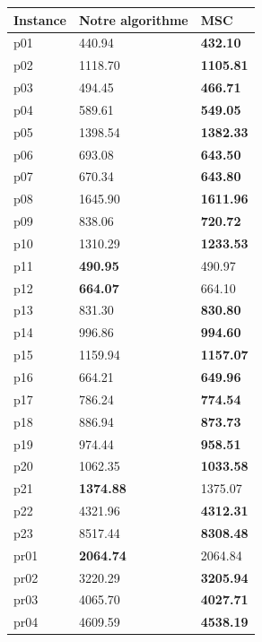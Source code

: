 \begin{xltabular}{12cm}{|X|X|X|}
  \hline
  Instance & Notre algorithme     & MSC      \\\hline
  p01      &  440.94  & \textbf{432.10}   \\\hline
  p02      & 1118.70 & \textbf{1105.81}  \\\hline
  p03      & 494.45  & \textbf{466.71}   \\\hline
  p04      & 589.61  & \textbf{549.05}   \\\hline
  p05      & 1398.54 & \textbf{1382.33}  \\\hline
  p06      & 693.08  & \textbf{643.50}   \\\hline
  p07      & 670.34  & \textbf{643.80}   \\\hline
  p08      & 1645.90 & \textbf{1611.96}  \\\hline
  p09      & 838.06  & \textbf{720.72}   \\\hline
  p10      & 1310.29 & \textbf{1233.53}  \\\hline
  p11      & \textbf{490.95}& 490.97   \\\hline
  p12      & \textbf{664.07}  & 664.10   \\\hline
  p13      & 831.30  & \textbf{830.80}   \\\hline
  p14      & 996.86  & \textbf{994.60}   \\\hline
  p15      & 1159.94 & \textbf{1157.07}  \\\hline
  p16      & 664.21  & \textbf{649.96}   \\\hline
  p17      & 786.24  & \textbf{774.54}   \\\hline
  p18      & 886.94  & \textbf{873.73}   \\\hline
  p19      & 974.44  & \textbf{958.51}   \\\hline
  p20      & 1062.35 & \textbf{1033.58}  \\\hline
  p21      & \textbf{1374.88} & 1375.07 \\\hline
  p22      & 4321.96 & \textbf{4312.31}  \\\hline
  p23      & 8517.44 & \textbf{8308.48}  \\\hline
  pr01     & \textbf{2064.74} & 2064.84  \\\hline
  pr02     & 3220.29 & \textbf{3205.94}  \\\hline
  pr03     & 4065.70 & \textbf{4027.71}  \\\hline
  pr04     & 4609.59 & \textbf{4538.19}  \\\hline

\end{xltabular}
